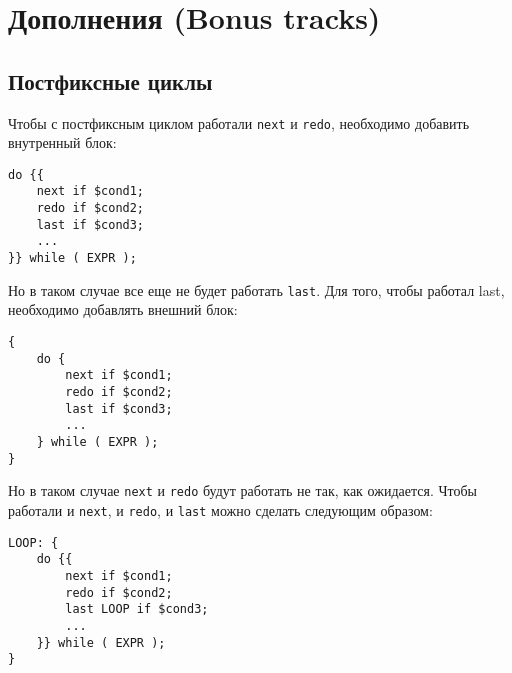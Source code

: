 \chapter*{Дополнения (Bonus tracks)} %

\section{Постфиксные циклы}
Чтобы с постфиксным циклом работали \verb|next| и \verb|redo|, необходимо добавить внутренный блок:
\begin{verbatim}
do {{
	next if $cond1;
	redo if $cond2;
	last if $cond3;
	...
}} while ( EXPR );
\end{verbatim}
Но в таком случае все еще не будет работать \verb|last|. Для того, чтобы работал {last}, необходимо добавлять внешний блок:
\begin{verbatim}
{
	do {
		next if $cond1;
		redo if $cond2;
		last if $cond3;
		...
	} while ( EXPR );
}
\end{verbatim}
Но в таком случае \verb|next| и \verb|redo| будут работать не так, как ожидается. Чтобы работали и \verb|next|, и \verb|redo|, и \verb|last| можно сделать следующим образом:
\begin{verbatim}
LOOP: {
	do {{
		next if $cond1;
		redo if $cond2;
		last LOOP if $cond3;
		...
	}} while ( EXPR );
}
\end{verbatim}


